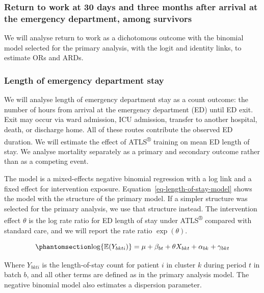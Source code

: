 \documentclass[
]{scrartcl}
\begin{document}
\subsubsection{Return to work at 30 days and three months after arrival
at the emergency department, among
survivors}\label{sec-return-to-work-at-30-days-and-three-months-after-arrival-at-the-emergency-department-among-survivors}

We will analyse return to work as a dichotomous outcome with the
binomial model selected for the primary analysis, with the logit and
identity links, to estimate ORs and ARDs.

\subsubsection{Length of emergency department
stay}\label{sec-length-of-emergency-department-stay}

We will analyse length of emergency department stay as a count outcome:
the number of hours from arrival at the emergency department (ED) until
ED exit. Exit may occur via ward admission, ICU admission, transfer to
another hospital, death, or discharge home. All of these routes
contribute the observed ED duration. We will estimate the effect of
ATLS\textsuperscript{®} training on mean ED length of stay. We analyse
mortality separately as a primary and secondary outcome rather than as a
competing event.

The model is a mixed-effects negative binomial regression with a log
link and a fixed effect for intervention exposure.
Equation~\ref{eq-length-of-stay-model} shows the model with the
structure of the primary model. If a simpler structure was selected for
the primary analysis, we use that structure instead. The intervention
effect \(\theta\) is the log rate ratio for ED length of stay under
ATLS\textsuperscript{®} compared with standard care, and we will report
the rate ratio \(\exp(\theta)\).

\begin{equation}\phantomsection\label{eq-length-of-stay-model}{
\log\{\mathbb{E}(Y_{bkti})\}
= \mu + \beta_{bt} + \theta X_{bkt} + \alpha_{bk} + \gamma_{bkt}
}\end{equation}

Where \(Y_{bkti}\) is the length-of-stay count for patient \(i\) in
cluster \(k\) during period \(t\) in batch \(b\), and all other terms
are defined as in the primary analysis model. The negative binomial
model also estimates a dispersion parameter.
\end{document}
